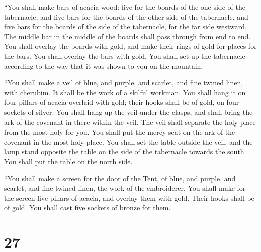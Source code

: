  ``You shall make bars of acacia wood: five for the
boards of the one side of the tabernacle,  and five bars
for the boards of the other side of the tabernacle, and five bars for
the boards of the side of the tabernacle, for the far side westward.
 The middle bar in the middle of the boards shall pass
through from end to end.  You shall overlay the boards
with gold, and make their rings of gold for places for the bars. You
shall overlay the bars with gold.  You shall set up the
tabernacle according to the way that it was shown to you on the
mountain.

 ``You shall make a veil of blue, and purple, and
scarlet, and fine twined linen, with cherubim. It shall be the work of a
skilful workman.  You shall hang it on four pillars of
acacia overlaid with gold; their hooks shall be of gold, on four sockets
of silver.  You shall hang up the veil under the clasps,
and shall bring the ark of the covenant in there within the veil. The
veil shall separate the holy place from the most holy for you.
 You shall put the mercy seat on the ark of the covenant
in the most holy place.  You shall set the table outside
the veil, and the lamp stand opposite the table on the side of the
tabernacle towards the south. You shall put the table on the north side.

 ``You shall make a screen for the door of the Tent, of
blue, and purple, and scarlet, and fine twined linen, the work of the
embroiderer.  You shall make for the screen five pillars
of acacia, and overlay them with gold. Their hooks shall be of gold. You
shall cast five sockets of bronze for them.

\hypertarget{section-26}{%
\section{27}\label{section-26}}

